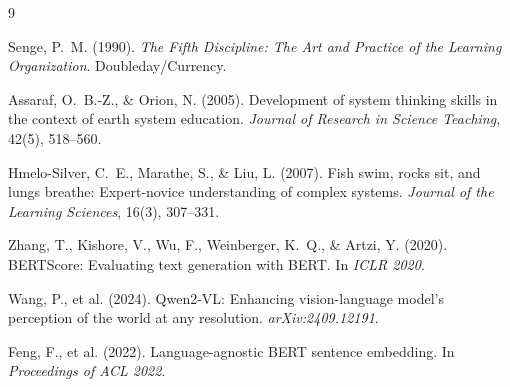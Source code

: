 \documentclass[12pt,a4paper]{article}
\begin{document}
\begin{thebibliography}{9}

Senge, P.~M. (1990).
\newblock \textit{The Fifth Discipline: The Art and Practice of the Learning Organization}.
\newblock Doubleday/Currency.

Assaraf, O.~B.-Z., \& Orion, N. (2005).
\newblock Development of system thinking skills in the context of earth system education.
\newblock \textit{Journal of Research in Science Teaching}, 42(5), 518--560.

Hmelo-Silver, C.~E., Marathe, S., \& Liu, L. (2007).
\newblock Fish swim, rocks sit, and lungs breathe: Expert-novice understanding of
  complex systems.
\newblock \textit{Journal of the Learning Sciences}, 16(3), 307--331.

Zhang, T., Kishore, V., Wu, F., Weinberger, K.~Q., \& Artzi, Y. (2020).
\newblock BERTScore: Evaluating text generation with BERT.
\newblock In \textit{ICLR 2020}.

Wang, P., et al. (2024).
\newblock Qwen2-VL: Enhancing vision-language model's perception of the world at any resolution.
\newblock \textit{arXiv:2409.12191}.

Feng, F., et al. (2022).
\newblock Language-agnostic BERT sentence embedding.
\newblock In \textit{Proceedings of ACL 2022}.

\end{thebibliography}
\end{document}
